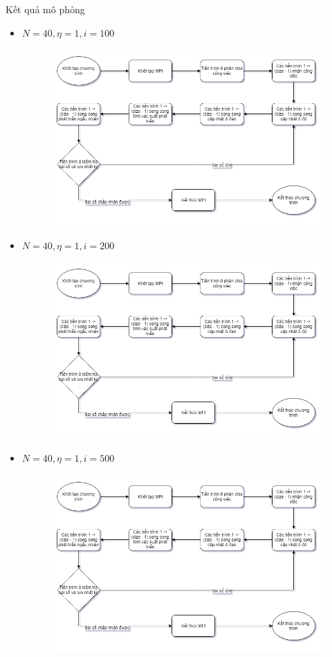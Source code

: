 \begin{frame}[allowframebreaks]{Kết quả mô phỏng}
\begin{itemize}
	\item $N = 40, \eta = 1, i = 100$
    \begin{figure}[H]
        \centering
        \includegraphics[width=110mm]{img/algo-flowchart.png}
    \end{figure}
\end{itemize}
\break
\begin{itemize}
    \item $N = 40, \eta = 1, i = 200$
    \begin{figure}[H]
        \centering
        \includegraphics[width=110mm]{img/algo-flowchart.png}
    \end{figure}
\end{itemize}
\break
\begin{itemize}
    \item $N = 40, \eta = 1, i = 500$
    \begin{figure}[H]
        \centering
        \includegraphics[width=110mm]{img/algo-flowchart.png}

\end{figure}
\end{itemize}
\end{frame}
